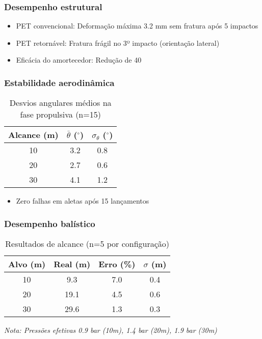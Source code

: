 \subsubsection{Desempenho estrutural}
\begin{itemize}
    \item PET convencional: Deformação máxima 3.2 mm sem fratura após 5 impactos
    \item PET retornável: Fratura frágil no 3º impacto (orientação lateral)
    \item Eficácia do amortecedor: Redução de 40%
\end{itemize}

\subsubsection{Estabilidade aerodinâmica}
\begin{table}[H]
    \centering
    \caption{Desvios angulares médios na fase propulsiva (n=15)}
    \begin{tabular}{|c|c|c|}
        \hline
        Alcance (m) & $\bar{\theta}$ ($^\circ$) & $\sigma_\theta$ ($^\circ$) \\
        \hline
        10 & 3.2 & 0.8 \\
        20 & 2.7 & 0.6 \\
        30 & 4.1 & 1.2 \\
        \hline
    \end{tabular}
\end{table}
\begin{itemize}
    \item Zero falhas em aletas após 15 lançamentos
\end{itemize}

\subsubsection{Desempenho balístico}
\begin{table}[H]
    \centering
    \caption{Resultados de alcance (n=5 por configuração)}
    \begin{tabular}{|c|c|c|c|}
        \hline
        Alvo (m) & Real (m) & Erro (\%) & $\sigma$ (m) \\
        \hline
        10 & 9.3 & 7.0 & 0.4 \\
        20 & 19.1 & 4.5 & 0.6 \\
        30 & 29.6 & 1.3 & 0.3 \\
        \hline
    \end{tabular}
\end{table}
\textit{Nota: Pressões efetivas 0.9 bar (10m), 1.4 bar (20m), 1.9 bar (30m)}

